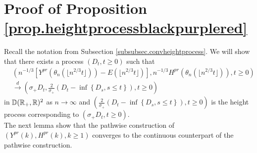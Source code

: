 \section{Proof of Proposition \ref{prop.heightprocessblackpurplered}}\label{appendix.heightprocessblackpurplered}
Recall the notation from Subsection \ref{subsubsec.convheightprocess}. We will show that there exists a process $(D_t,t\geq 0)$ such that 
\begin{align*}
    &\left(n^{-1/3}\left[Y^{pr}\left(\theta_n\left(\lfloor n^{2/3}t\rfloor \right)\right)-E\left(\lfloor n^{2/3}t\rfloor \right)\right], n^{-1/3}H^{pr}\left(\theta_n\left(\lfloor n^{2/3}t\rfloor \right)\right),t\geq 0\right)\\
    &\overset{d}{\to}\left(\sigma_+D_t,\frac{2}{\sigma_+}\left(D_t-\inf\left\{D_s,s\leq t\right\}\right),t\geq 0\right)
\end{align*}
in ${\mathbb D}({\mathbb R}_+,{\mathbb R})^2$ as $n\to \infty$ and $\left(\frac{2}{\sigma_+}\left(D_t-\inf\left\{D_s,s\leq t\right\}\right),t\geq 0\right)$ is the height process corresponding to $(\sigma_+D_t,t\geq 0)$.
\\The next lemma show that the pathwise construction of $(Y^{pr}(k),H^{pr}(k),k\geq 1)$ converges to the continuous counterpart of the pathwise construction.

